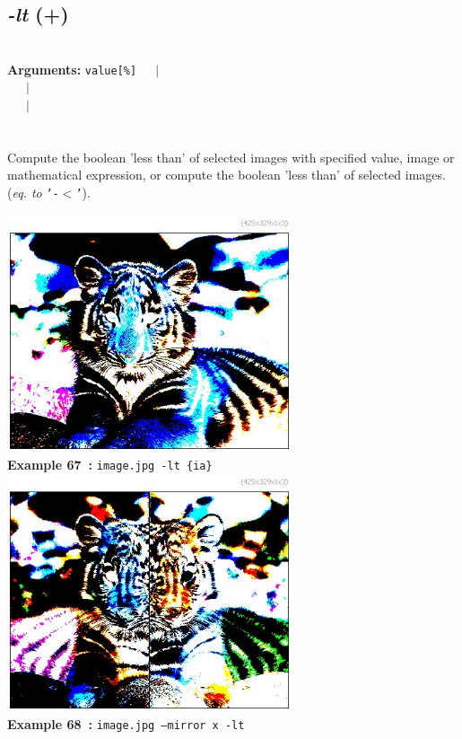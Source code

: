 \documentclass[a4paper,11pt,twoside]{book}
\begin{document}
\subsection{\emph{-lt} (+)}\vspace*{-0.5em}
~\\\textbf{Arguments: } 
{\small \texttt{value[\%]}}~~~$|$\\
\hspace*{2.2cm}{\small \texttt{[image]}}~~~$|$\\
~~~$|$\\
\\~\\
Compute the boolean 'less than' of selected images with specified value, image or
mathematical expression, or compute the boolean 'less than' of selected images.
~\\(\emph{eq. to} {\small \texttt{'-$<$'}}).
\begin{center}\includegraphics[keepaspectratio=true,height=7cm,width=\textwidth]{img/gmic_def67.jpg}\\
{\footnotesize \textbf{Example 67~:} \texttt{image.jpg -lt \{ia\}}}
\\\includegraphics[keepaspectratio=true,height=7cm,width=\textwidth]{img/gmic_def68.jpg}\\
{\footnotesize \textbf{Example 68~:} \texttt{image.jpg --mirror x -lt}}
\end{center}
\end{document}
